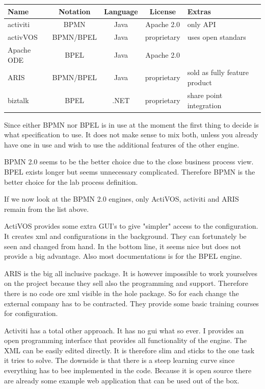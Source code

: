 \documentclass[paper=a4,twoside=false,BCOR=0mm,DIV=calc,fontsize=12pt]{scrartcl}
\begin{document}
\begin{center}
\begin{tabular}{l | c c c p{3cm}}
\toprule

Name & Notation & Language & License & Extras \\

\midrule

activiti & BPMN & Java & Apache 2.0 & only API \\
activVOS & BPMN/BPEL & Java & proprietary &  uses open standars \\
Apache ODE & BPEL & Java & Apache 2.0 &   \\
ARIS & BPMN/BPEL & Java & proprietary &  sold as fully feature product \\
biztalk & BPEL & .NET & proprietary &  share point integration \\


\bottomrule
\end{tabular}

\label{tab:enginecomparison}
\end{center}

Since either BPMN nor BPEL is in use at the moment the first thing to decide is what specification to use.
It does not make sense to mix both, unless you already have one in use and wish to use the additional features of the other engine. 

BPMN 2.0 seems to be the better choice due to the close business process view. BPEL exists longer but seems unnecessary complicated.
Therefore BPMN is the better choice for the lab process definition. 

If we now look at the BPMN 2.0 engines, only ActiVOS, activiti and ARIS remain from the list above.

ActiVOS provides some extra GUI's to give "simpler" access to the configuration. It creates xml and configurations in the background.
They can fortunately be seen and changed from hand. In the bottom line, it seems nice but does not provide a big advantage. Also most documentations is for the BPEL engine.

ARIS is the big all inclusive package. It is however impossible to work yourselves on the project because they sell also the programming and support. Therefore there is no code ore xml visible in the hole package. So for each change the external company has to be contracted.
They provide some basic training courses for configuration.

Activiti has a total other approach. It has no gui what so ever. I provides an open programming interface that provides all functionality 
of the engine. The XML can be easily edited directly. It is therefore slim and sticks to the one task it tries to solve.
The downside is that there is a steep learning curve since everything has to bee implemented in the code. 
Because it is open source there are already some example web application that can be used out of the box. 
\end{document}

